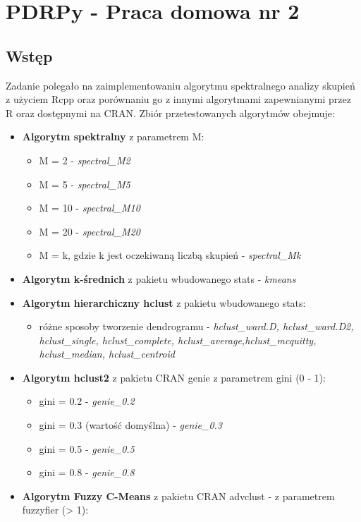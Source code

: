 \documentclass[]{article}
\title{}
\author{}
\date{}
\providecommand{\tightlist}{%
  \setlength{\itemsep}{0pt}\setlength{\parskip}{0pt}}
\begin{document}
\section{PDRPy - Praca domowa nr 2}\label{pdrpy---praca-domowa-nr-2}

\subsection{Wstęp}\label{wstep}

Zadanie polegało na zaimplementowaniu algorytmu spektralnego analizy
skupień z użyciem Rcpp oraz porównaniu go z innymi algorytmami
zapewnianymi przez R oraz dostępnymi na CRAN. Zbiór przetestowanych
algorytmów obejmuje:

\begin{itemize}
\tightlist
\item
  \textbf{Algorytm spektralny} z parametrem M:

  \begin{itemize}
  \tightlist
  \item
    M = 2 - \emph{spectral\_M2}
  \item
    M = 5 - \emph{spectral\_M5}
  \item
    M = 10 - \emph{spectral\_M10}
  \item
    M = 20 - \emph{spectral\_M20}
  \item
    M = k, gdzie k jest oczekiwaną liczbą skupień - \emph{spectral\_Mk}
  \end{itemize}
\item
  \textbf{Algorytm k-średnich} z pakietu wbudowanego stats -
  \emph{kmeans}
\item
  \textbf{Algorytm hierarchiczny hclust} z pakietu wbudowanego stats:

  \begin{itemize}
  \tightlist
  \item
    różne sposoby tworzenie dendrogramu - \emph{hclust\_ward.D,
    hclust\_ward.D2, hclust\_single, hclust\_complete,
    hclust\_average,hclust\_mcquitty, hclust\_median, hclust\_centroid}
  \end{itemize}
\item
  \textbf{Algorytm hclust2} z pakietu CRAN genie z parametrem gini (0 -
  1):

  \begin{itemize}
  \tightlist
  \item
    gini = 0.2 - \emph{genie\_0.2}
  \item
    gini = 0.3 (wartość domyślna) - \emph{genie\_0.3}
  \item
    gini = 0.5 - \emph{genie\_0.5}
  \item
    gini = 0.8 - \emph{genie\_0.8}
  \end{itemize}
\item
  \textbf{Algorytm Fuzzy C-Means} z pakietu CRAN advclust - z parametrem
  fuzzyfier (\textgreater{} 1):


\end{itemize}
\end{document}
